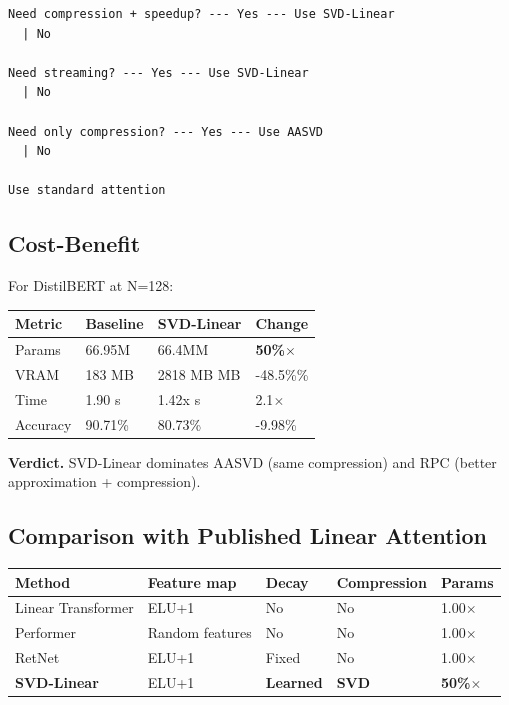 \begin{lstlisting}
Need compression + speedup? --- Yes --- Use SVD-Linear
  | No
   
Need streaming? --- Yes --- Use SVD-Linear
  | No
   
Need only compression? --- Yes --- Use AASVD
  | No
   
Use standard attention
\end{lstlisting}

\subsection{Cost-Benefit}

For DistilBERT at N=128:

\begin{table}[H]
\centering
\small
\begin{tabular}{llll}
\toprule
\textbf{Metric} & \textbf{Baseline} & \textbf{SVD-Linear} & \textbf{Change} \\
\midrule
Params & 66.95M & 66.4MM & \textbf{50\%$\times$} \\
VRAM & 183 MB & 2818 MB MB & -48.5\%\% \\
Time & 1.90 s & 1.42x s & 2.1$\times$ \\
Accuracy & 90.71\% & 80.73\% & -9.98\% \\
\bottomrule
\end{tabular}
\end{table}

\textbf{Verdict.} SVD-Linear dominates AASVD (same compression) and RPC (better 
approximation + compression).

\subsection{Comparison with Published Linear Attention}

\begin{table}[H]
\centering
\small
\begin{tabular}{lllll}
\toprule
\textbf{Method} & \textbf{Feature map} & \textbf{Decay} & \textbf{Compression} & \textbf{Params} \\
\midrule
Linear Transformer & ELU+1 & No & No & 1.00$\times$ \\
Performer & Random features & No & No & 1.00$\times$ \\
RetNet & ELU+1 & Fixed & No & 1.00$\times$ \\
\textbf{SVD-Linear} & ELU+1 & \textbf{Learned} & \textbf{SVD} & \textbf{50\%$\times$} \\
\bottomrule
\end{tabular}
\end{table}

